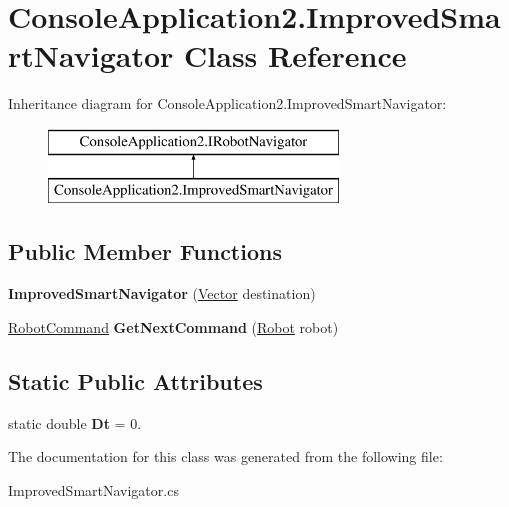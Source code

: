 \hypertarget{class_console_application2_1_1_improved_smart_navigator}{}\section{Console\+Application2.\+Improved\+Smart\+Navigator Class Reference}
\label{class_console_application2_1_1_improved_smart_navigator}
Inheritance diagram for Console\+Application2.\+Improved\+Smart\+Navigator\+:\begin{figure}[H]
\begin{center}
\leavevmode
\includegraphics[height=2.000000cm]{class_console_application2_1_1_improved_smart_navigator}
\end{center}
\end{figure}
\subsection*{Public Member Functions}
\begin{DoxyCompactItemize}
\item 
\hypertarget{class_console_application2_1_1_improved_smart_navigator_a66a5460c9224f63e6ad58c92ad114169}{}{\bfseries Improved\+Smart\+Navigator} (\hyperlink{class_console_application2_1_1_vector}{Vector} destination)\label{class_console_application2_1_1_improved_smart_navigator_a66a5460c9224f63e6ad58c92ad114169}

\item 
\hypertarget{class_console_application2_1_1_improved_smart_navigator_aced8a6e0abdc2e8700d6526964f0932e}{}\hyperlink{class_console_application2_1_1_robot_command}{Robot\+Command} {\bfseries Get\+Next\+Command} (\hyperlink{class_console_application2_1_1_robot}{Robot} robot)\label{class_console_application2_1_1_improved_smart_navigator_aced8a6e0abdc2e8700d6526964f0932e}

\end{DoxyCompactItemize}
\subsection*{Static Public Attributes}
\begin{DoxyCompactItemize}
\item 
\hypertarget{class_console_application2_1_1_improved_smart_navigator_a2b7c032e83e36f2fa695f62465fec9f8}{}static double {\bfseries Dt} = 0.\label{class_console_application2_1_1_improved_smart_navigator_a2b7c032e83e36f2fa695f62465fec9f8}

\end{DoxyCompactItemize}


The documentation for this class was generated from the following file\+:\begin{DoxyCompactItemize}
\item 
Improved\+Smart\+Navigator.\+cs\end{DoxyCompactItemize}
